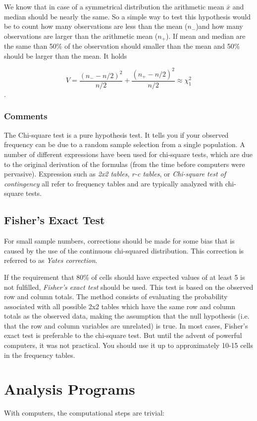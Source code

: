 We know that in case of a symmetrical distribution the arithmetic mean $\bar{x}$ and median should be nearly the same. So a simple way to test this hypothesis would be to count how many observations  are less than the mean ($n_-$)and how many observations are larger than the arithmetic mean ($n_+$). If mean and median are the same than 50\% of the observation should smaller than the mean and 50\% should be larger than the mean. It holds

\begin{equation}
  V = \frac{(n_- - n/2)^2}{n/2} + \frac{(n_+ - n/2)^2}{n/2} \approx \chi^2_1
\end{equation}.


\subsubsection{Comments}
The Chi-square test is a pure hypothesis test. It tells you if your observed frequency can be due to a random sample selection from a single population. A number of different expressions have been used for chi-square tests, which are due to the original derivation of the formulas (from the time before computers were pervasive). Expression such as \emph{2x2 tables}, \emph{r-c tables}, or \emph{Chi-square test of contingency} all refer to frequency tables and are typically analyzed with chi-square tests.

\subsection{Fisher's Exact Test} 
For small sample numbers, corrections should be made for some bias that is caused by the use of the continuous chi-squared distribution. This correction is referred to as \emph{Yates correction}.

If the requirement that 80\% of cells should have expected values of at least 5 is not fulfilled, \emph{Fisher's exact test} should be used. This test is based on the observed row and column totals. The method consists of evaluating the probability associated with all possible 2x2 tables which have the same row and column totals as the observed data, making the assumption that the null hypothesis (i.e. that the row and column variables are unrelated) is true.
In most cases, Fisher's exact test is preferable to the chi-square test. But until the advent of powerful computers, it was not practical. You should use it up to approximately 10-15 cells in the frequency tables.

\section{Analysis Programs}

With computers, the computational steps are trivial:


